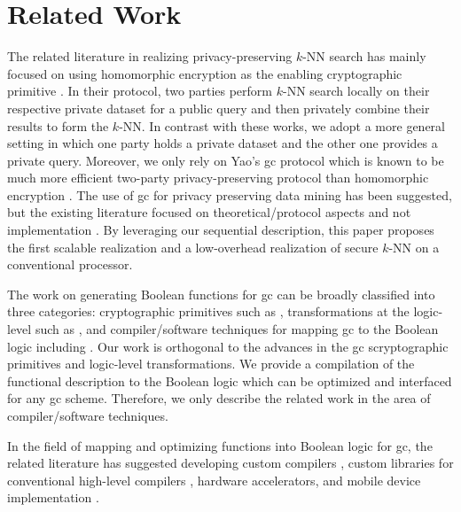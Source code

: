 \section{Related Work}\label{sec:knn-related}
The related literature in realizing privacy-preserving $k$-NN search has mainly focused on using homomorphic encryption as the enabling cryptographic primitive \cite{shaneck2009privacy,qi2008efficient}.
In their protocol, two parties perform $k$-NN search locally on their respective private dataset for a public query and then privately combine their results to form the $k$-NN.
In contrast with these works, we adopt a more general setting in which one party holds a private dataset and the other one provides a private query.
Moreover, we only rely on Yao's \acrshort{gc} protocol which is known to be much more efficient two-party privacy-preserving protocol than homomorphic encryption \cite{huang2012private,brenner2011hcrypt}.
The use of \acrshort{gc} for privacy preserving data mining has been suggested, but the existing literature focused on theoretical/protocol aspects and not implementation \cite{agrawal2000privacy}.
By leveraging our sequential description, this paper proposes the first scalable realization and a low-overhead realization of secure $k$-NN on a conventional processor.

The work on generating Boolean functions for \acrshort{gc} can be broadly classified into three categories: cryptographic primitives such as \cite{malkhi2004fairplay,bellare2013efficient}, transformations at the logic-level such as \cite{kolesnikov2008improved}, and compiler/software techniques for mapping \acrshort{gc} to the Boolean logic including \cite{malkhi2004fairplay,holzer2012secure,kreuter2013pcf}.
Our work is orthogonal to the advances in the \acrshort{gc} scryptographic primitives and logic-level transformations.
We provide a compilation of the functional description to the Boolean logic which can be optimized and interfaced for any \acrshort{gc} scheme.
Therefore, we only describe the related work in the area of compiler/software techniques.

In the field of mapping and optimizing functions into Boolean logic for \acrshort{gc}, the related literature has suggested developing custom compilers \cite{malkhi2004fairplay,henecka2010tasty,holzer2012secure,kreuter2013pcf}, custom libraries for conventional high-level compilers \cite{huang2011faster,malka2011vmcrypt,henecka2013faster}, hardware accelerators\cite{pu2013computing,jarvinen2010garbled,bellare2013efficient}, and mobile device implementation \cite{mood2012memory}.

